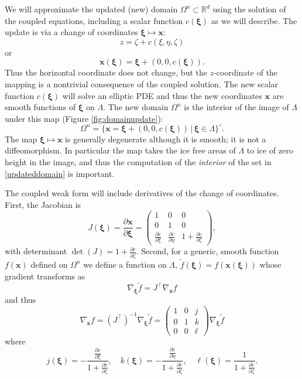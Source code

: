 \documentclass[letterpaper,final,12pt,reqno]{amsart}
\newcommand{\RR}{\mathbb{R}}
\newcommand{\grad}{\nabla}
\newcommand{\bx}{\mathbf{x}}
\newcommand{\bxi}{\bm{\xi}}
\begin{document}
We will approximate the updated (new) domain $\Omega^n \subset \RR^d$ using the solution of the coupled equations, including a scalar function $c(\bxi)$ as we will describe.  The update is via a change of coordinates $\bxi \mapsto \bx$:
\begin{equation*}
z=\zeta+c(\xi,\eta,\zeta)
\end{equation*}
or
\begin{equation}
\bx(\bxi) = \bxi + (0,0,c(\bxi)). \label{changecoords}
\end{equation}
Thus the horizontal coordinate does not change, but the $z$-coordinate of the mapping is a nontrivial consequence of the coupled solution.  The new scalar function $c(\bxi)$ will solve an elliptic PDE and thus the new coordinates $\bx$ are smooth functions of $\bxi$ on $\Lambda$.  The new domain $\Omega^n$ is the interior of the image of $\Lambda$ under this map (Figure \ref{fig:domainupdate}):
\begin{equation}
\Omega^n = \{\bx=\bxi + (0,0,c(\bxi)) \,\big|\, \bxi \in \Lambda\}^\circ. \label{updateddomain}
\end{equation}
The map $\bxi \mapsto \bx$ is generally degenerate although it is smooth; it is not a diffeomorphism.  In particular the map takes the ice free areas of $\Lambda$ to ice of zero height in the image, and thus the computation of the \emph{interior} of the set in \eqref{updateddomain} is important.

The coupled weak form will include derivatives of the change of coordinates.  First, the Jacobian is
\begin{equation}
J(\bxi) = \frac{\partial \bx}{\partial \bm{\xi}} = \begin{pmatrix} 1 & 0 & 0 \\  0 & 1 & 0 \\ \frac{\partial c}{\partial \xi} & \frac{\partial c}{\partial \eta} & 1+\frac{\partial c}{\partial \zeta} \end{pmatrix}, \label{jacchange}
\end{equation}
with determinant $\det(J)=1+\frac{\partial c}{\partial \zeta}$.  Second, for a generic, smooth function $f(\bx)$ defined on $\Omega^n$ we define a function on $\Lambda$, $\tilde f(\bxi) = f(\bx(\bxi))$ whose gradient transforms as
\begin{equation}
\grad_{\bxi} \tilde f = J^\top \grad_{\bx} f
\end{equation}
and thus
\begin{equation}
\grad_{\bx} f = (J^\top)^{-1} \grad_{\bxi} \tilde f = \begin{pmatrix} 1 & 0 & j \\ 0 & 1 & k \\ 0 & 0 & \ell \end{pmatrix} \grad_{\bxi} \tilde f \label{changederivatives}
\end{equation}
where
\begin{equation}
j(\bxi) = -\frac{\frac{\partial c}{\partial \xi}}{1+\frac{\partial c}{\partial \zeta}}, \quad k(\bxi) = -\frac{\frac{\partial c}{\partial \eta}}{1+\frac{\partial c}{\partial \zeta}}, \quad \ell(\bxi) = \frac{1}{1+\frac{\partial c}{\partial \zeta}}. \label{definejkl}
\end{equation}
\end{document}
